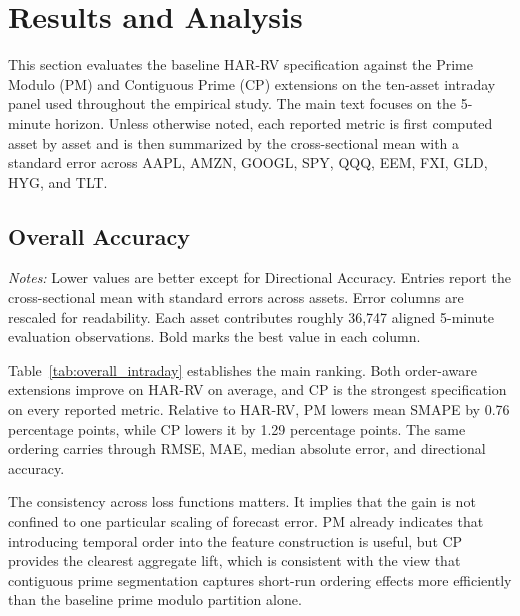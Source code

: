 \documentclass[a4paper]{article}
\begin{document}
\section{Results and Analysis}
\captionsetup{font=small,labelfont=bf,labelsep=period,hypcap=false}

\noindent
This section evaluates the baseline HAR-RV specification against the Prime Modulo (PM) and Contiguous Prime (CP) extensions on the ten-asset intraday panel used throughout the empirical study. The main text focuses on the 5-minute horizon. Unless otherwise noted, each reported metric is first computed asset by asset and is then summarized by the cross-sectional mean with a standard error across AAPL, AMZN, GOOGL, SPY, QQQ, EEM, FXI, GLD, HYG, and TLT.

\subsection{Overall Accuracy}

{\renewcommand{\thetable}{1A}
\begin{center}
\label{tab:overall_intraday}
\small
\renewcommand{\arraystretch}{1.15}
\setlength{\tabcolsep}{6pt}
\resizebox{0.98\textwidth}{!}{}

\vspace{0.1cm}
\footnotesize \parbox{0.92\textwidth}{\textit{Notes:} Lower values are better except for Directional Accuracy. Entries report the cross-sectional mean with standard errors across assets. Error columns are rescaled for readability. Each asset contributes roughly 36,747 aligned 5-minute evaluation observations. Bold marks the best value in each column.}
\end{center}}

\noindent
Table~\ref{tab:overall_intraday} establishes the main ranking. Both order-aware extensions improve on HAR-RV on average, and CP is the strongest specification on every reported metric. Relative to HAR-RV, PM lowers mean SMAPE by 0.76 percentage points, while CP lowers it by 1.29 percentage points. The same ordering carries through RMSE, MAE, median absolute error, and directional accuracy.

\noindent
The consistency across loss functions matters. It implies that the gain is not confined to one particular scaling of forecast error. PM already indicates that introducing temporal order into the feature construction is useful, but CP provides the clearest aggregate lift, which is consistent with the view that contiguous prime segmentation captures short-run ordering effects more efficiently than the baseline prime modulo partition alone.
\end{document}
